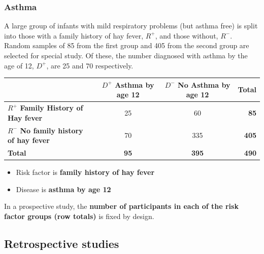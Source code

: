 \documentclass[a4paper]{article}
\begin{document}
\subsubsection{Asthma}
A large group of infants with mild respiratory problems (but asthma free) is split into those with a family history of hay fever, \textcolor{myred}{\( R^+ \)}, and those without, \textcolor{myred}{\( R^- \)}. Random samples of 85 from the first group and 405 from the second group are selected for special study. Of these, the number diagnosed with asthma by the age of 12, \textcolor{mygreen}{\( D^+ \)}, are 25 and 70 respectively.
\begin{table}[H]
	\centering
	\begin{tabular}{@{}lccr@{}}
	\toprule
				 														 & \textcolor{mygreen}{\textbf{\( D^+ \) Asthma by age 12}} & \textcolor{mygreen}{\textbf{\( D^- \) No Asthma by age 12}} & \textbf{Total}    \\ \midrule
	\textcolor{myred}{\textbf{\( R^+ \) Family History of Hay fever}}    & 25    		  											& 60        		                                          & \textcolor{myred}{\textbf{85}}  \\
	\textcolor{myred}{\textbf{\( R^- \) No family history of hay fever}} & 70    		  											& 335       		                                          & \textcolor{myred}{\textbf{405}} \\ \midrule
	\textbf{Total} 													     & \textbf{95}    											& \textbf{395}                                                & \textbf{490} \\ \bottomrule
	\end{tabular}
\end{table}
\begin{itemize}
	\item Risk factor is \textcolor{myred}{\textbf{family history of hay fever}}
	\item Disease is \textcolor{mygreen}{\textbf{asthma by age 12}}
\end{itemize}
\begin{goldbox}
	In a prospective study, the \textcolor{myred}{\textbf{number of participants in each of the risk factor groups (row totals)}} is fixed by design.
\end{goldbox}
\subsection{Retrospective studies}
\end{document}
